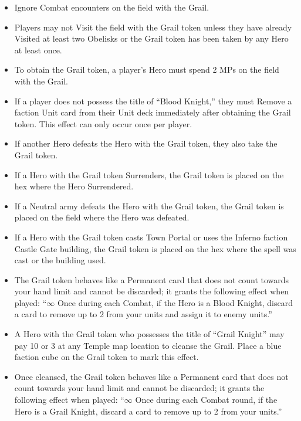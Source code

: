 \begin{multicols*}{2}
\begin{itemize}
    \item Ignore Combat encounters on the field with the Grail.
    \item Players may not Visit the field with the Grail token unless they have already Visited at least two Obelisks or the Grail token has been taken by any Hero at least once.
    \item To obtain the Grail token, a player’s Hero must spend 2 MPs on the field with the Grail.
    \item If a player does not possess the title of ``\textcolor{darkcandyapplered}{Blood Knight},'' they must Remove a faction Unit card from their Unit deck immediately after obtaining the Grail token. This effect can only occur once per player.
    \item If another Hero defeats the Hero with the Grail token, they also take the Grail token.
    \item If a Hero with the Grail token Surrenders, the Grail token is placed on the hex where the Hero Surrendered.
    \item If a Neutral army defeats the Hero with the Grail token, the Grail token is placed on the field where the Hero was defeated.
    \item If a Hero with the Grail token casts Town Portal or uses the Inferno faction Castle Gate building, the Grail token is placed on the hex where the spell was cast or the building used.
    \item The Grail token behaves like a Permanent card that does not count towards your hand limit and cannot be discarded; it grants the following effect when played: ``$\infty$ Once during each Combat, if the Hero is a \textcolor{darkcandyapplered}{Blood Knight}, discard a card to remove up to 2  from your units and assign it to enemy units.''
    \item A Hero with the Grail token who possesses the title of ``\textcolor{darkcerulean}{Grail Knight}'' may pay 10  or 3  at any Temple map location to cleanse the Grail. Place a blue faction cube on the Grail token to mark this effect.
    \item Once cleansed, the Grail token behaves like a Permanent card that does not count towards your hand limit and cannot be discarded; it grants the following effect when played: ``$\infty$ Once during each Combat round, if the Hero is a \textcolor{darkcerulean}{Grail Knight}, discard a card to remove up to 2  from your units.''
\end{itemize}


\end{multicols*}
